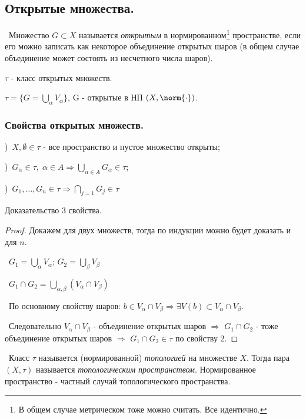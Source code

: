 \subsection*{Открытые множества.}

\noindent \textasteriskcentered~Множество $G \subset X$ называется \textit{открытым} в нормированном\footnote{В общем случае метрическом тоже можно считать. Все идентично.} пространстве, если его можно записать как некоторое объединение открытых шаров (в общем случае объединение может состоять из несчетного числа шаров).

\smallskip
$\tau$ - класс открытых множеств.

\smallskip
$\tau = \{ G = \bigcup\limits_\alpha V_\alpha\}$, G - открытые в НП $(X, \norm{\cdot})$.


\subsubsection*{Свойства открытых множеств.}

)~$X, \emptyset \in \tau$ - все пространство и пустое множество открыты;

)~$G_\alpha \in \tau, \; \alpha \in A \Rightarrow \bigcup\limits_{\alpha \in A} G_\alpha \in \tau$;

)~$G_1, \dots, G_n \in \tau \Rightarrow \bigcap\limits_{j = 1} G_j \in \tau$

\begin{proofexpr*}
    Доказательство 3 свойства.
\end{proofexpr*}
\begin{proof}
Докажем для двух множеств, тогда по индукции можно будет доказать и для $n$.

\smallskip
\noindent \textbullet~$G_1 = \bigcup\limits_{\alpha} V_\alpha$; $G_2 = \bigcup\limits_{\beta} V_\beta$

\smallskip
\noindent \textbullet~$G_1 \cap G_2 = \bigcup\limits_{\alpha, \beta} (V_\alpha \cap V_\beta)$

\smallskip
\noindent \textbullet~По основному свойству шаров: $b \in V_\alpha \cap V_\beta \Rightarrow \exists V(b) \subset 
V_\alpha \cap V_\beta$.

\smallskip
\noindent \textbullet~Следовательно $V_\alpha \cap V_\beta$ - объединение открытых шаров $\Rightarrow$ $G_1 \cap G_2$ - тоже объединение открытых шаров $\Rightarrow$ $G_1 \cap G_2 \in \tau$ по свойству 2.
\end{proof}

\noindent \textasteriskcentered~Класс $\tau$ называется (нормированной) \textit{топологией} на множестве $X$. Тогда пара $(X, \tau)$ называется \textit{топологическим
пространством}. Нормированное пространство - частный случай топологического пространства.


